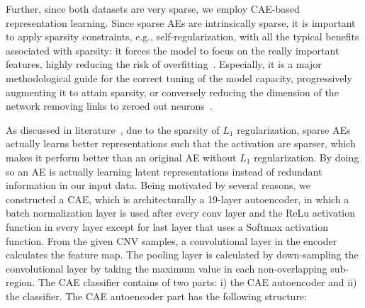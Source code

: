 \hspace*{3.5mm} Further, since both datasets are very sparse, we employ CAE-based representation learning. Since sparse AEs are intrinsically sparse, it is important to apply sparsity constraints, e.g., self-regularization, with all the typical benefits associated with sparsity: it forces the model to focus on the really important features, highly reducing the risk of overfitting~\cite{karimBIB2019}. Especially, it is a major methodological guide for the correct tuning of the model capacity, progressively augmenting it to attain sparsity, or conversely reducing the dimension of the network removing links to zeroed out neurons~\cite{sparseAE}. 

\hspace*{3.5mm} As discussed in literature~\cite{karimBIB2019,karim2018recurrent}, due to the sparsity of $L_1$ regularization, sparse AEs actually learns better representations such that the activation are sparser, which makes it perform better than an original AE without $L_1$ regularization. By doing so an AE is actually learning latent representations instead of redundant information in our input data. 
Being motivated by several reasons, we constructed a CAE, which is architecturally a 19-layer autoencoder, in which a batch normalization layer is used after every conv layer and the ReLu activation function in every layer except for last layer that uses a Softmax activation function. From the given CNV samples, a convolutional layer in the encoder calculates the feature map. The pooling layer is calculated by down-sampling the convolutional layer by taking the maximum value in each non-overlapping sub-region. The CAE classifier contains of two parts: i) the CAE autoencoder and ii) the classifier. The CAE autoencoder part has the following structure: 

